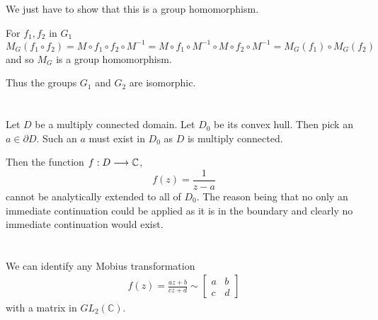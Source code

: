 \documentclass{unswmaths}
\begin{document}
We just have to show that this is a group homomorphism.  

For $ f_1, f_2 $ in $ G_1 $
$$ M_G(f_1 \circ f_2) = M\circ f_1 \circ f_2 \circ M^{-1} = M\circ f_1 \circ M^{-1} \circ M \circ f_2 \circ M^{-1} = M_G(f_1) \circ M_G(f_2) $$
and so $ M_G $ is a group homomorphism. 

Thus the groups $ G_1 $ and $ G_2 $ are isomorphic. 

\section{}
Let $ D $ be a multiply connected domain. Let $ D_0 $ be its convex hull. Then pick an $ a \in \partial D $. Such an $ a $ must exist in $ D_0 $ as $ D $ is multiply connected.

Then the function $ f : D \longrightarrow \mathbb{C} $, $$ f(z) = \frac{1}{z-a} $$ cannot be analytically extended to all of $ D_0 $. The reason being that no only an immediate continuation could be applied as it is in the boundary and clearly no immediate continuation would exist.


\section{}

We can identify any Mobius transformation 
\begin{align}
    f(z) = \frac{az + b}{cz + d} \sim \left[ \begin{array}{cc} a & b \\ c & d \end{array}\right]
\end{align}
with a matrix in $ GL_2(\mathbb{C}) $.
\end{document}
